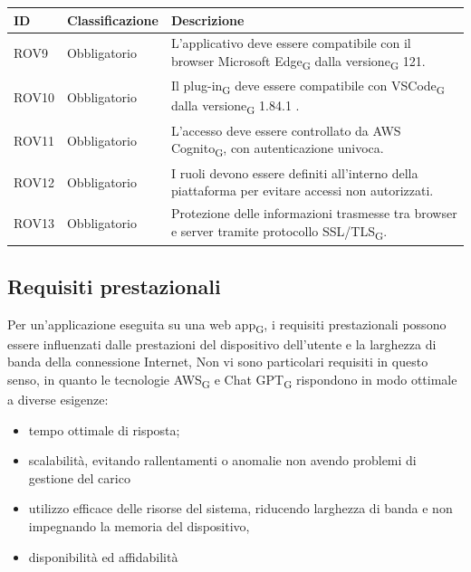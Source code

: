 \documentclass{article}
\begin{document}
\newpage
\begin{center}
\begin{tabular}{|p{3cm}|p{3cm}|p{6cm}|}
\rowcolor{Blue} 
\hline
ID & Classificazione & Descrizione \\
\hline
\rowcolor{LighterBlue} 
ROV9 & Obbligatorio & L'applicativo deve essere compatibile con il browser Microsoft Edge\textsubscript{G} dalla versione\textsubscript{G} 121.\\
\hline
\rowcolor{LightBlue}
ROV10 & Obbligatorio & Il plug-in\textsubscript{G} deve essere compatibile con VSCode\textsubscript{G} dalla versione\textsubscript{G} 1.84.1 .\\
\hline
\rowcolor{LighterBlue}
ROV11 & Obbligatorio & L'accesso deve essere controllato da AWS Cognito\textsubscript{G}, con autenticazione univoca.\\
\hline
\rowcolor{LightBlue}
ROV12 & Obbligatorio & I ruoli devono essere definiti all'interno della piattaforma per evitare accessi non autorizzati.\\
\hline
\rowcolor{LighterBlue}
ROV13 & Obbligatorio & Protezione delle informazioni trasmesse tra browser e server tramite protocollo SSL/TLS\textsubscript{G}.\\
\hline
\end{tabular}
\label{tab:reqvincolo}
\end{center}

\subsection{Requisiti prestazionali}
Per un'applicazione eseguita su una web app\textsubscript{G}, i requisiti prestazionali possono essere influenzati dalle prestazioni del dispositivo dell'utente e la larghezza di banda della connessione Internet, Non vi sono particolari requisiti in questo senso, in quanto le tecnologie AWS\textsubscript{G} e Chat GPT\textsubscript{G} rispondono in modo ottimale a diverse esigenze:
\begin{itemize}
\item tempo ottimale di risposta;
\item scalabilità, evitando rallentamenti o anomalie non avendo problemi di gestione del carico 
\item utilizzo efficace delle risorse del sistema, riducendo larghezza di banda e non impegnando la memoria del dispositivo, 
\item disponibilità ed affidabilità
\end{itemize}
\end{document}
